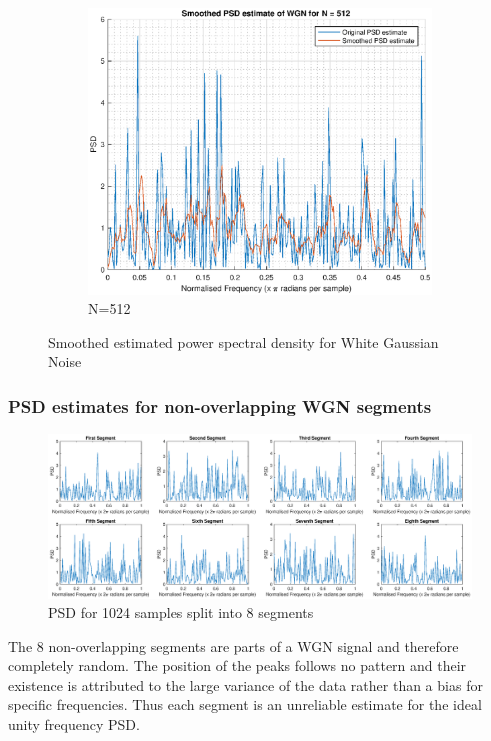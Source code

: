 \documentclass{article}
\begin{document}
\begin{figure}[h!]
\begin{subfigure}{0.32\textwidth}
\centering
\includegraphics[width = \textwidth]{pgm_512_smooth}
\caption{N=512}
\label{fig:pgm_512_smooth}
\end{subfigure}
\caption{Smoothed estimated power spectral density for White Gaussian Noise}
\label{fig:pgm_test_smooth}
\end{figure}


\subsubsection{PSD estimates for non-overlapping WGN segments}

\begin{figure}[h!]
\centering
\includegraphics[width= \textwidth]{pgm_eightseg}
\caption{\label{fig:pgm_eightseg} PSD for 1024 samples split into 8 segments}
\end{figure}

The 8 non-overlapping segments are parts of a WGN signal and therefore completely random. The position of the peaks follows no pattern and their existence is attributed to the large variance of the data rather than a bias for specific frequencies. Thus each segment is an unreliable estimate for the ideal unity frequency PSD.
\end{document}
